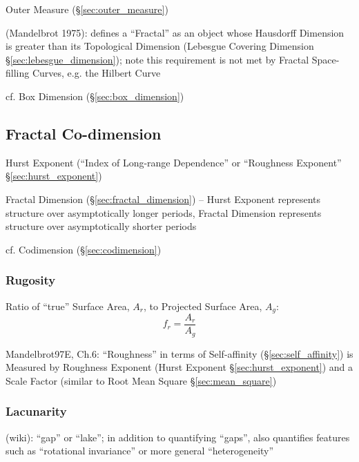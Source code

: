 Outer Measure (\S\ref{sec:outer_measure})

(Mandelbrot 1975): defines a ``Fractal'' as an object whose Hausdorff Dimension
is greater than its Topological Dimension (Lebesgue Covering Dimension
\S\ref{sec:lebesgue_dimension}); note this requirement is not met by Fractal
Space-filling Curves, e.g. the Hilbert Curve

cf. Box Dimension (\S\ref{sec:box_dimension})



\subsection{Fractal Co-dimension}\label{sec:fractal_codimension}

Hurst Exponent (``Index of Long-range Dependence'' or ``Roughness Exponent''
\S\ref{sec:hurst_exponent})

Fractal Dimension (\S\ref{sec:fractal_dimension}) -- Hurst Exponent represents
structure over asymptotically longer periods, Fractal Dimension represents
structure over asymptotically shorter periods

cf. Codimension (\S\ref{sec:codimension})



\subsubsection{Rugosity}\label{sec:rugosity}


Ratio of ``true'' Surface Area, $A_r$, to Projected Surface Area, $A_g$:
\[
  f_r = \frac{A_r}{A_g}
\]

Mandelbrot97E, Ch.6: ``Roughness'' in terms of Self-affinity
(\S\ref{sec:self_affinity}) is Measured by Roughness Exponent (Hurst Exponent
\S\ref{sec:hurst_exponent}) and a Scale Factor (similar to Root Mean Square
\S\ref{sec:mean_square})



\subsubsection{Lacunarity}\label{sec:lacunarity}


(wiki): ``gap'' or ``lake''; in addition to quantifying ``gaps'', also
quantifies features such as ``rotational invariance'' or more general
``heterogeneity''

